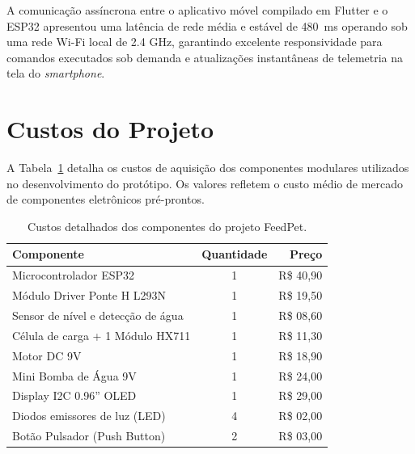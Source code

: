 \documentclass[12pt]{article}\usepackage{sbc-template}\usepackage{graphicx,url}\usepackage[utf8]{inputenc}
\begin{document}
A comunicação assíncrona entre o aplicativo móvel compilado em Flutter e o ESP32 apresentou uma latência de rede média e estável de 480~ms operando sob uma rede Wi-Fi local de 2.4 GHz, garantindo excelente responsividade para comandos executados sob demanda e atualizações instantâneas de telemetria na tela do \textit{smartphone}.

\section{Custos do Projeto}

A Tabela~\ref{tab:custos_projeto} detalha os custos de aquisição dos componentes modulares utilizados no desenvolvimento do protótipo. Os valores refletem o custo médio de mercado de componentes eletrônicos pré-prontos.

\begin{table}[ht]
    \centering
    \caption{Custos detalhados dos componentes do projeto FeedPet.}
    \label{tab:custos_projeto}
    \vskip 0.1in 
    \begin{tabular}{|l|c|r|}
    \hline
    \textbf{Componente}                            & \textbf{Quantidade}       & \textbf{Preço}            \\ \hline
    Microcontrolador ESP32                         & 1                         & R\$ 40,90                 \\ \hline
    Módulo Driver Ponte H L293N                    & 1                         & R\$ 19,50                 \\ \hline
    Sensor de nível e detecção de água             & 1                         & R\$ 08,60                 \\ \hline
    Célula de carga + 1 Módulo HX711               & 1                         & R\$ 11,30                 \\ \hline
    Motor DC 9V                                    & 1                         & R\$ 18,90                 \\ \hline
    Mini Bomba de Água 9V                          & 1                         & R\$ 24,00                 \\ \hline
    Display I2C 0.96” OLED				& 1				& R\$ 29,00			\\ \hline
    Diodos emissores de luz (LED)                  & 4                         & R\$ 02,00                 \\ \hline
    Botão Pulsador (Push Button)                   & 2                         & R\$ 03,00                 \\ \hline

\end{tabular}
\end{table}
\end{document}
